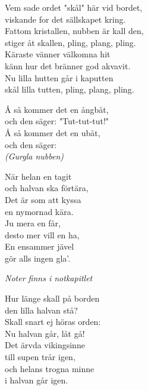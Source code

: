 \documentclass[a6paper,10pt]{article}
\begin{document}
\newpage
\setlength{\oddsidemargin}{-0.37in}
\noindent
\begin{center}
\end{center}
Vem sade ordet "skål" här vid bordet,\\
viskande for det sällskapet kring.\\
Fattom kristallen, nubben är kall den,\\
stiger åt skallen, pling, plang, pling.\\
Käraste vänner välkomna hit\\
känn hur det bränner god akvavit.\\
Nu lilla hutten går i kaputten\\
skål lilla tutten, pling, plang, pling.
\vspace{60pt}
\begin{center}
\end{center}
Å så kommer det en ångbåt, \\
och den säger: "Tut-tut-tut!" \\
Å så kommer det en ubåt, \\
och den säger: \\
\textit{(Gurgla nubben) }

\setlength{\oddsidemargin}{-0.47in}
\noindent
\begin{center}
\end{center}
När helan en tagit \\
och halvan ska förtära, \\
Det är som att kyssa \\
en nymornad kära. 
\vspace{5pt} \\
Ju mera en får, \\
desto mer vill en ha, \\
En ensammer jävel \\
gör alls ingen gla'. 
\vspace{60pt}
\begin{center}
\textit{Noter finns i notkapitlet}
\end{center}
Hur länge skall på borden\\ 
den lilla halvan stå? \\
Skall snart ej höras orden: \\
Nu halvan går, låt gå!
\vspace{5pt} \\
Det ärvda vikingsinne \\
till supen trår igen, \\
och helans trogna minne \\
i halvan går igen.
\end{document}
